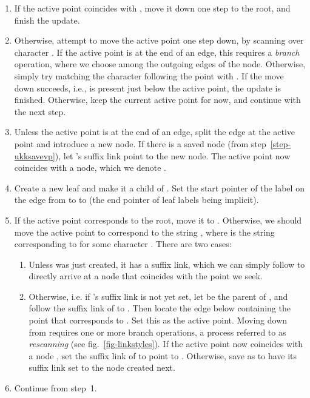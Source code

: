 \documentclass{llncs}
\begin{document}
\begin{enumerate}
\item If the active point coincides with , move it down one step to
  the root, and finish the update.
\item Otherwise, attempt to move the active point one step down, by scanning
  over character . If the active point is at the end of an edge, this
  requires a \emph{branch} operation, where we choose among the outgoing
  edges of the node. Otherwise,
  simply try matching the character following the point with . If the move down
  succeeds, i.e.,  is present just below the active point, the update
  is finished. Otherwise, keep the current active point for now, and continue with
  the next step.
\item\label{step-ukksplit} Unless the active point is at the end of an edge,
  split the edge at the active point and introduce a new node. If there is a
  saved node  (from step~\ref{step-ukksavevp}), let 's suffix link
  point to the new node. The active point now coincides with a node, which we
  denote .
\item Create a new leaf  and make it a child of . Set the start pointer
  of the label on the edge from  to  to  (the end pointer of leaf
  labels being implicit).
\item If the active point corresponds to the root, move it to
  . Otherwise, we should move the active point to correspond
  to the string , where  is the string corresponding to  for some character
  . There are two cases:
  \begin{enumerate}
  \item Unless  was just created, it has a suffix link, which
    we can simply follow to directly arrive at a node that coincides with the
    point we seek.
  \item\label{step-ukkrescan} Otherwise, i.e. if 's suffix link is not yet set, let  be
    the parent of , and follow the suffix link of  to . Then locate
    the edge below  containing the point that corresponds to . Set this
    as the active point. Moving down from  requires one or more branch
    operations, a process referred to as \emph{rescanning} (see fig.~\ref{fig-linkstyles}). If
    the active point now coincides with a node , set the suffix link of 
    to point to . Otherwise, save  as  to have its suffix link set
    to the node created next.\label{step-ukksavevp}
  \end{enumerate}
\item Continue from step~1.
\end{enumerate}
\end{document}
